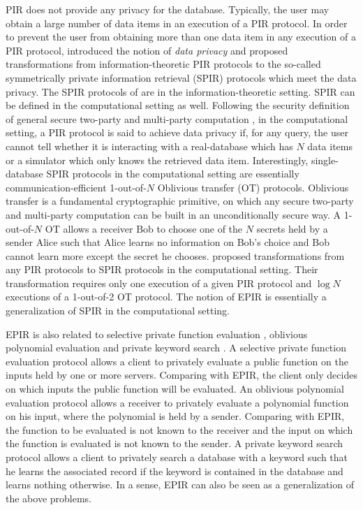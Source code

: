 \documentclass[JMC]{degruyter-journal}
\begin{document}
PIR does not provide any privacy for the database. Typically, the
user may obtain  a large number of data items in an execution of a
PIR protocol. In order to prevent the user from obtaining more than
one data item in any execution of a PIR protocol, \cite{GIKM98}
introduced the notion of {\em data privacy} and proposed
transformations from information-theoretic PIR protocols to  the
so-called symmetrically private information retrieval (SPIR)
 protocols
 which meet the data privacy. The SPIR protocols of \cite{GIKM98} are in the information-theoretic setting.
SPIR can be defined  in the computational setting as well. Following
the security definition of general secure two-party and multi-party
computation \cite{Gol04}, in the computational setting, a PIR
protocol is said to achieve  data privacy if, for any query, the
user cannot tell whether it is interacting with a real-database
which has $N$ data items or a simulator which only knows the
retrieved data item.
 Interestingly, single-database SPIR protocols in  the computational setting  are essentially
 communication-efficient 1-out-of-$N$ Oblivious transfer (OT)
 \cite{Rab81,EGL85,BCR87,GMW87,Kil88} protocols.
Oblivious transfer \cite{Rab81} is a fundamental  cryptographic
primitive, on which any secure two-party and multi-party computation
can be built  \cite{Kil88} in an unconditionally secure way. A
1-out-of-$N$ OT allows a receiver Bob to choose one of the $N$
secrets held by a sender Alice such that Alice learns no information
on Bob's choice and Bob cannot learn more except the secret he
chooses. \cite{NP99} proposed transformations from any PIR protocols
to SPIR protocols in the computational setting. Their transformation
requires only one execution of a given PIR protocol and $\log N$
executions of a 1-out-of-2 OT protocol. The notion of EPIR
\cite{BCPT07,BC09} is essentially a generalization of SPIR in the
computational setting.

EPIR is also  related to  selective private function evaluation
\cite{CIKRRW01}, oblivious polynomial evaluation  \cite{NP99} and
private keyword search \cite{FIPR05}. A selective private function
evaluation protocol \cite{CIKRRW01} allows a client to privately
evaluate a public function on the inputs  held by one or more
servers. Comparing with EPIR, the client  only decides on which
inputs the public function will be evaluated. An oblivious
polynomial evaluation protocol \cite{NP99} allows a receiver to
privately evaluate  a polynomial function on  his  input, where the
polynomial is held by a sender. Comparing with EPIR, the function to
be evaluated is not known to the receiver and the input on which the
function is evaluated is not known to the sender. A private keyword
search protocol  \cite{FIPR05} allows a client to privately search a
database with a keyword such that he learns the associated record if
the keyword is contained in the database and learns nothing
otherwise. In a sense, EPIR can  also be seen as a generalization of
the above problems.
\end{document}
